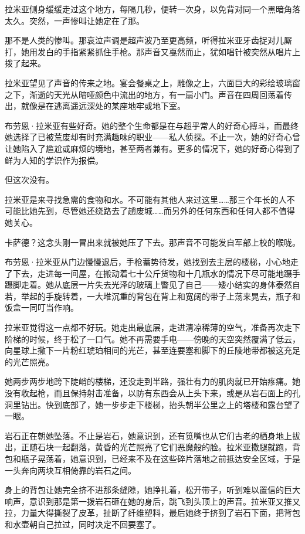 \documentclass[AutoFakeBold=true]{book}
\begin{document}
拉米亚侧身缓缓走过这个地方，每隔几秒，便转一次身，以免背对同一个黑暗角落太久。突然，一声惨叫让她定在了那。

那不是人类的惨叫。那哀泣声调是超声波乃至更高频，听得拉米亚牙齿捉对儿厮打，她用发白的手指紧紧抓住手枪。那声音又戛然而止，犹如唱针被突然从唱片上拨了起来。

拉米亚望见了声音的传来之地。宴会餐桌之上，雕像之上，六面巨大的彩绘玻璃窗之下，渐逝的天光从暗哑颜色中流出的地方，有一扇小门。声音在四周回荡着传出，就像是在逃离遥远深处的某座地牢或地下室。

布劳恩·拉米亚有些好奇。她的整个生命都是在与超乎常人的好奇心搏斗，而最终她选择了已被荒废却有时充满趣味的职业——私人侦探。不止一次，她的好奇心曾让她陷入了尴尬或麻烦的境地，甚至两者兼有。更多的情况下，她的好奇心得到了鲜为人知的学识作为报偿。

但这次没有。

拉米亚是来寻找急需的食物和水。不可能有其他人来过这里……那三个年长的人不可能比她先到，尽管她还绕路去了趟废城……而另外的任何东西和任何人都不值得她关心。

{\kaishu 卡萨德}？这念头刚一冒出来就被她压了下去。那声音不可能发自军部上校的喉咙。

布劳恩·拉米亚从门边慢慢退后，手枪蓄势待发，她找到去主层的楼梯，小心地走了下去，走进每一间屋，在搬动着七十公斤货物和十几瓶水的情况下尽可能地蹑手蹑脚走着。她从底层一片失去光泽的玻璃上瞥见了自己——矮小结实的身体泰然自若，举起的手旋转着，一大堆沉重的背包在背上和宽阔的带子上荡来晃去，瓶子和饭盒一同叮当作响。

拉米亚觉得这一点都不好玩。她走出最底层，走进清凉稀薄的空气，准备再次走下阶梯的时候，终于松了一口气。她不再需要手电——傍晚的天空突然覆满了低云，向星球上撒下一片粉红琥珀相间的光芒，甚至连要塞和脚下的丘陵地带都被这充足的光芒照亮。

她两步两步地跨下陡峭的楼梯，还没走到半路，强壮有力的肌肉就已开始疼痛。她没有收起枪，而且保持射击准备，以防有东西会从上头下来，或是从岩石面上的孔洞里钻出。快到底部了，她一步步走下楼梯，抬头朝半公里之上的塔楼和露台望了一眼。

岩石正在朝她坠落。不止是岩石，她意识到，还有笕嘴也从它们古老的栖身地上拔出，正随石块一起翻落，黄昏的光芒照亮了它们恶魔般的脸。拉米亚撒腿就跑，背包和瓶子晃荡着，她意识到，已经来不及在这些碎片落地之前抵达安全区域，于是一头奔向两块互相倚靠的岩石之间。

身上的背包让她完全挤不进那条缝隙，她挣扎着，松开带子，听到难以置信的巨大响声，意识到那是第一拨岩石砸在她的身后，跳飞到头顶上的声音。拉米亚又推又拉，力量大得撕裂了皮革，扯断了纤维塑料，最后她终于挤到了岩石下面，把背包和水壶朝自己拉过，同时决定不回要塞了。
\end{document}
